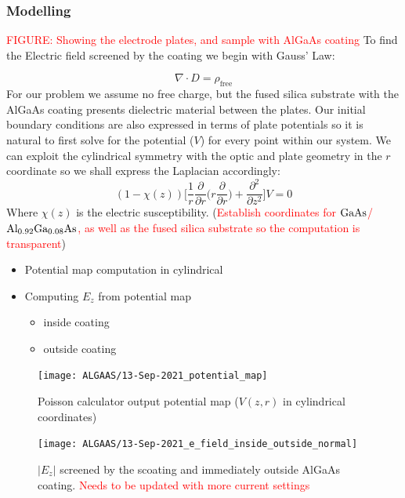 \subsubsection{Modelling}

\textcolor{red}{FIGURE: Showing the electrode plates, and sample with AlGaAs coating}
To find the Electric field screened by the coating we begin with Gauss' Law:

\begin{equation}
\nabla \cdot D = \rho_\mathrm{free}
\end{equation}
For our problem we assume no free charge, but the fused silica substrate with the AlGaAs coating presents dielectric material between the plates. Our initial boundary conditions are also expressed in terms of plate potentials so it is natural to first solve for the potential ($V$) for every point within our system. We can exploit the cylindrical symmetry with the optic and plate geometry in the $r$ coordinate so we shall express the Laplacian accordingly:
\begin{equation}
(1-\chi(z))\bigg[\frac{1}{r}\frac{\partial}{\partial r} \bigg( r \frac{\partial}{\partial r}\bigg) + \frac{\partial^2}{\partial z^2}\bigg]V = 0
\end{equation}
Where $\chi (z)$ is the electric susceptibility. (\textcolor{red}{Establish coordinates for $\mathrm{GaAs}$/$\mathrm{Al_{0.92}Ga_{0.08}As}$, as well as the fused silica substrate so the computation is transparent})
\\

\begin{itemize}
\item Potential map computation in cylindrical
\item Computing $E_z$ from potential map
\begin{itemize}
\item inside coating
\item outside coating
\end{itemize}
\end{itemize}

\begin{figure}[H]
\texttt{[image: ALGAAS/13-Sep-2021\_potential\_map]}
\caption{Poisson calculator output potential map ($V(z,r)$ in cylindrical coordinates)}
\label{fig:poisson_calc_output}
\end{figure}

\begin{figure}[H]
\texttt{[image: ALGAAS/13-Sep-2021\_e\_field\_inside\_outside\_normal]}
\caption{$|E_z|$ screened by the scoating and immediately outside AlGaAs coating. \textcolor{red}{Needs to be updated with more current settings}}


\label{fig:Ez}
\end{figure}

